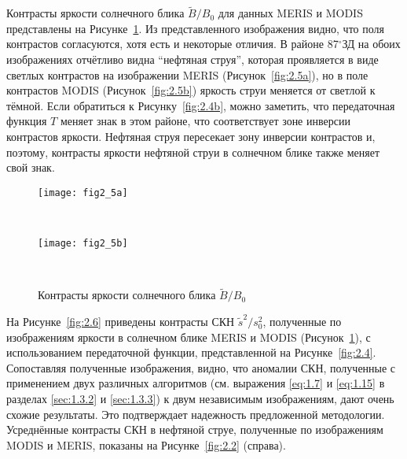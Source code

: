Контрасты яркости солнечного блика $\tilde{B}/B_{0}$ для данных MERIS и MODIS представлены на Рисунке~\ref{fig:2.5}. Из представленного изображения видно, что поля контрастов согласуются, хотя есть и некоторые отличия. В районе 87${}^\circ$ЗД на обоих изображениях отчётливо видна ``нефтяная струя'', которая проявляется в виде светлых контрастов на изображении MERIS (Рисунок~\ref{fig:2.5a}), но в поле контрастов MODIS (Рисунок~\ref{fig:2.5b}) яркость струи меняется от светлой к тёмной. Если обратиться к Рисунку~\ref{fig:2.4b}, можно заметить, что передаточная функция $T$ меняет знак в этом районе, что соответствует зоне инверсии контрастов яркости. Нефтяная струя пересекает зону инверсии контрастов и, поэтому, контрасты яркости нефтяной струи в солнечном блике также меняет свой знак.



\begin{figure}[H]
   	\centering
	\begin{minipage}{.97\textwidth}
	    \subcaptionbox{\label{fig:2.5a}}
		{\texttt{[image: fig2\_5a]}}
	\end{minipage}
	\hfill
	\\
	\begin{minipage}{.97\textwidth}
	    \subcaptionbox{\label{fig:2.5b}}
		{\texttt{[image: fig2\_5b]}}
	\end{minipage}
    \\
    \caption{Контрасты яркости солнечного блика $\tilde{B}/B_{0}$}
    \label{fig:2.5}
\end{figure}


На Рисунке~\ref{fig:2.6} приведены контрасты СКН $\tilde{s}^{2} /s_{0}^{2}$, полученные по изображениям яркости в солнечном блике MERIS и MODIS (Рисунок~\ref{fig:2.5}), с использованием передаточной функции, представленной на Рисунке~\ref{fig:2.4}. Сопоставляя полученные изображения, видно, что аномалии СКН, полученные с применением двух различных алгоритмов (см. выражения \eqref{eq:1.7} и \eqref{eq:1.15} в разделах \ref{sec:1.3.2} и \ref{sec:1.3.3}) к двум независимым изображениям, дают очень схожие результаты. Это подтверждает надежность предложенной методологии. Усреднённые контрасты СКН в нефтяной струе, полученные по изображениям MODIS и MERIS, показаны на Рисунке~\ref{fig:2.2} (справа).

